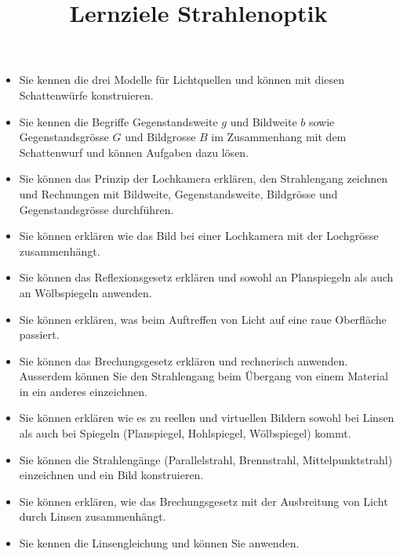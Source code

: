 \documentclass[12pt,a4paper,twoside]{article}
\date{}
\title{Lernziele Strahlenoptik}
\begin{document}
\maketitle



\begin{itemize}
	\item Sie kennen die drei Modelle für Lichtquellen und können mit diesen Schattenwürfe konstruieren.

	\item Sie kennen die Begriffe Gegenstandsweite $g$ und Bildweite $b$ sowie Gegenstandsgrösse $G$ und Bildgrosse $B$ 
		im Zusammenhang mit dem Schattenwurf und können Aufgaben dazu lösen.

	\item Sie können das Prinzip der Lochkamera erklären, den Strahlengang zeichnen und Rechnungen 
		mit Bildweite, Gegenstandsweite, Bildgrösse und Gegenstandsgrösse durchführen.
	\item Sie können erklären wie das Bild bei einer Lochkamera mit der Lochgrösse zusammenhängt.


	\item Sie können das Reflexionsgesetz erklären und sowohl an Planspiegeln als auch an Wölbspiegeln anwenden.
	\item Sie können erklären, was beim Auftreffen von Licht auf eine raue Oberfläche passiert.

	\item Sie können das Brechungsgesetz erklären und rechnerisch anwenden. 
		Ausserdem können Sie den Strahlengang beim Übergang von einem Material in ein anderes einzeichnen.

	\item Sie können erklären wie es zu reellen und virtuellen Bildern sowohl bei Linsen als auch bei Spiegeln (Planspiegel, Hohlspiegel, Wölbspiegel) kommt.
	\item Sie können die Strahlengänge (Parallelstrahl, Brennstrahl, Mittelpunktstrahl) einzeichnen und ein Bild konstruieren.

	\item Sie können erklären, wie das Brechungsgesetz mit der Ausbreitung von Licht durch Linsen zusammenhängt.
	\item Sie kennen die Linsengleichung und können Sie anwenden.

\end{itemize}
\end{document}
